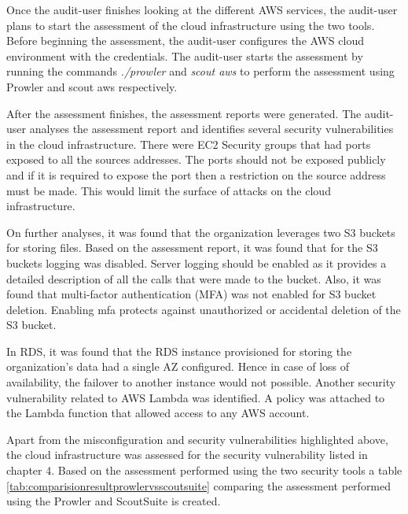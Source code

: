 \par Once the audit-user finishes looking at the different AWS services, the audit-user plans to start the assessment of the cloud infrastructure using the two tools.
Before beginning the assessment, the audit-user configures the AWS cloud environment with the credentials.
The audit-user starts the assessment by running the commands \textit{./prowler} and \textit{scout aws} to perform the assessment using Prowler and scout aws respectively.

\par After the assessment finishes, the assessment reports were generated.
The audit-user analyses the assessment report and identifies several security vulnerabilities in the cloud infrastructure.
There were EC2 Security groups that had ports exposed to all the sources addresses.
The ports should not be exposed publicly and if it is required to expose the port then a restriction on the source address must be made.
This would limit the surface of attacks on the cloud infrastructure.


\par On further analyses, it was found that the organization leverages two S3 buckets for storing files.
Based on the assessment report, it was found that for the S3 buckets logging was disabled.
Server logging should be enabled as it provides a detailed description of all the calls that were made to the bucket.
Also, it was found that multi-factor authentication (MFA) was not enabled for S3 bucket deletion.
Enabling \gls{mfa} protects against unauthorized or
accidental
deletion of the S3 bucket.



\par In RDS, it was found that the RDS instance provisioned for storing the organization’s data had a single AZ configured.
Hence in case of loss of availability, the failover to
another instance would not possible.
Another security vulnerability related to AWS Lambda was identified.
A policy was attached to the Lambda function that allowed access to any AWS account.


\par Apart from the misconfiguration and security vulnerabilities highlighted above, the cloud infrastructure was assessed for the security vulnerability listed in chapter 4.
Based on the assessment performed using the two security
tools a table \ref{tab:comparisionresultprowlervsscoutsuite} comparing the assessment performed using the Prowler and ScoutSuite is created.

